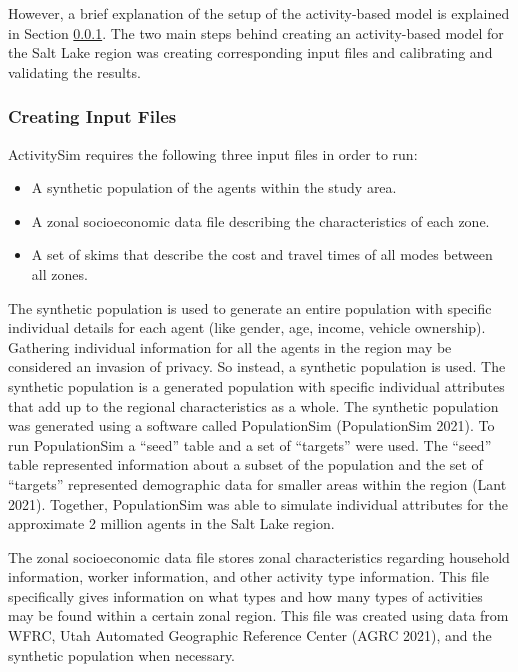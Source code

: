 \documentclass[12pt, oneside, openright]{byuthesis}
\providecommand{\tightlist}{%
  \setlength{\itemsep}{0pt}\setlength{\parskip}{0pt}}
\begin{document}
However, a brief explanation of the setup of the activity-based model is explained in Section \ref{asiminput}. The two main steps behind creating an activity-based model for the Salt Lake region was creating corresponding input files and calibrating and validating the results.

\hypertarget{asiminput}{%
\subsubsection{Creating Input Files}\label{asiminput}}

ActivitySim requires the following three input files in order to run:

\begin{itemize}
\tightlist
\item
  A synthetic population of the agents within the study area.
\item
  A zonal socioeconomic data file describing the characteristics of each zone.
\item
  A set of skims that describe the cost and travel times of all modes between all zones.
\end{itemize}

The synthetic population is used to generate an entire population with specific individual details for each agent (like gender, age, income, vehicle ownership). Gathering individual information for all the agents in the region may be considered an invasion of privacy. So instead, a synthetic population is used. The synthetic population is a generated population with specific individual attributes that add up to the regional characteristics as a whole. The synthetic population was generated using a software called PopulationSim (PopulationSim 2021). To run PopulationSim a ``seed'' table and a set of ``targets'' were used. The ``seed'' table represented information about a subset of the population and the set of ``targets'' represented demographic data for smaller areas within the region (Lant 2021). Together, PopulationSim was able to simulate individual attributes for the approximate 2 million agents in the Salt Lake region.

The zonal socioeconomic data file stores zonal characteristics regarding household information, worker information, and other activity type information. This file specifically gives information on what types and how many types of activities may be found within a certain zonal region. This file was created using data from WFRC, Utah Automated Geographic Reference Center (AGRC 2021), and the synthetic population when necessary.
\end{document}
